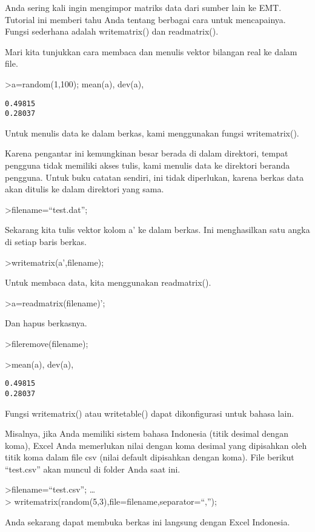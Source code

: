 \documentclass[
]{book}
\begin{document}
Anda sering kali ingin mengimpor matriks data dari sumber lain ke EMT. Tutorial ini memberi tahu Anda tentang berbagai cara untuk mencapainya. Fungsi sederhana adalah writematrix() dan readmatrix().

Mari kita tunjukkan cara membaca dan menulis vektor bilangan real ke dalam file.

\textgreater a=random(1,100); mean(a), dev(a),

\begin{verbatim}
0.49815
0.28037
\end{verbatim}

Untuk menulis data ke dalam berkas, kami menggunakan fungsi writematrix().

Karena pengantar ini kemungkinan besar berada di dalam direktori, tempat pengguna tidak memiliki akses tulis, kami menulis data ke direktori beranda pengguna. Untuk buku catatan sendiri, ini tidak diperlukan, karena berkas data akan ditulis ke dalam direktori yang sama.

\textgreater filename=``test.dat'';

Sekarang kita tulis vektor kolom a' ke dalam berkas. Ini menghasilkan satu angka di setiap baris berkas.

\textgreater writematrix(a',filename);

Untuk membaca data, kita menggunakan readmatrix().

\textgreater a=readmatrix(filename)';

Dan hapus berkasnya.

\textgreater fileremove(filename);

\textgreater mean(a), dev(a),

\begin{verbatim}
0.49815
0.28037
\end{verbatim}

Fungsi writematrix() atau writetable() dapat dikonfigurasi untuk bahasa lain.

Misalnya, jika Anda memiliki sistem bahasa Indonesia (titik desimal dengan koma), Excel Anda memerlukan nilai dengan koma desimal yang dipisahkan oleh titik koma dalam file csv (nilai default dipisahkan dengan koma). File berikut ``test.csv'' akan muncul di folder Anda saat ini.

\textgreater filename=``test.csv''; \ldots{}\\
\textgreater{} writematrix(random(5,3),file=filename,separator=``,'');

Anda sekarang dapat membuka berkas ini langsung dengan Excel Indonesia.
\end{document}

